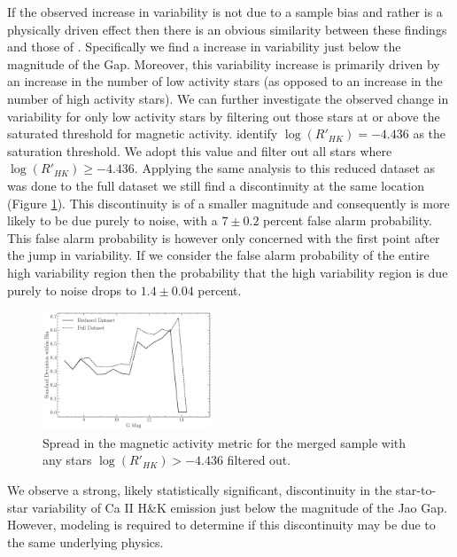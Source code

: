 If the observed increase in variability is not due to a sample bias and rather
is a physically driven effect then there is an obvious similarity between these
findings and those of \citet{Jao2023}. Specifically we find a increase in
variability just below the magnitude of the Gap. Moreover, this variability
increase is primarily driven by an increase in the number of low activity stars
(as opposed to an increase in the number of high activity stars). We can
further investigate the observed change in variability for only low activity
stars by filtering out those stars at or above the saturated threshold for
magnetic activity. \citet{Boudreaux2022} identify $\log(R'_{HK}) = -4.436$ as
the saturation threshold. We adopt this value and filter out all stars where
$\log(R'_{HK}) \geq -4.436$. Applying the same analysis to this reduced dataset
as was done to the full dataset we still find a discontinuity at the same
location (Figure \ref{fig:reduced}). This discontinuity is of a smaller
magnitude and consequently is more likely to be due purely to noise, with a
$7\pm0.2$ percent false alarm probability. This false alarm probability is
however only concerned with the first point after the jump in variability. If
we consider the false alarm probability of the entire high variability region
then the probability that the high variability region is due purely to noise
drops to $1.4\pm0.04$ percent.

\begin{figure}
  \centering
  \includegraphics[width=0.45\textwidth]{ReducedDeviation.pdf}
  \caption{Spread in the magnetic activity metric for the merged sample with
  any stars $\log(R'_{HK}) > -4.436$ filtered out.}
  \label{fig:reduced}
\end{figure}

We observe a strong, likely statistically significant, discontinuity in the
star-to-star variability of Ca II H\&K emission just below the magnitude
of the Jao Gap. However, modeling is required to determine if this discontinuity
may be due to the same underlying physics.

